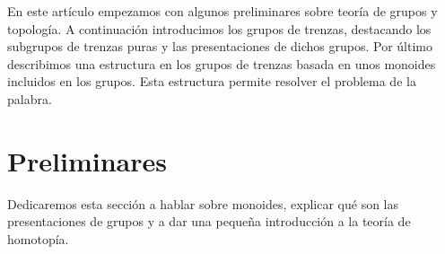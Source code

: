 \documentclass[bibtex, anon]{TEMat-article}
\begin{document}
En este artículo empezamos con algunos preliminares sobre teoría de grupos y topología. A continuación introducimos los grupos de trenzas, destacando los subgrupos de trenzas puras y las presentaciones de dichos grupos. Por último describimos una estructura en los grupos de trenzas basada en unos monoides incluidos en los grupos. Esta estructura permite resolver el problema de la palabra.
%

\section{Preliminares}

Dedicaremos esta sección a hablar sobre monoides, explicar qué son las presentaciones de grupos y a dar una pequeña introducción a la teoría de homotopía. 
\end{document}
